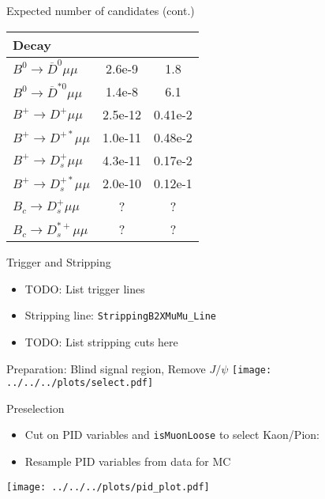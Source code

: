 \documentclass[compress,aspectratio=43]{beamer}
\begin{document}
\begin{frame}{Expected number of candidates (cont.)}
  \centering
  \begin{tabular}{l S S}
    \toprule
    Decay & {} \cite{evans1}\cite{evans2} & {} \\
    \midrule
    $B^0\to \overline{D}^0\mu\mu$ & 2.6e-9 & 1.8 \\
    $B^0\to \overline{D}^{*0}\mu\mu$ & 1.4e-8 & 6.1 \\
    $B^+\to D^+\mu\mu$ & 2.5e-12 & 0.41e-2 \\
    $B^+\to D^{+*}\mu\mu$ & 1.0e-11 & 0.48e-2 \\
    $B^+\to D_s^+\mu\mu$ & 4.3e-11 & 0.17e-2 \\
    $B^+\to D_s^{+*}\mu\mu$ & 2.0e-10 & 0.12e-1 \\
    $B_c\to D_s^+\mu\mu$ & ? & ? \\
    $B_c\to D_s^{*+}\mu\mu$ & ? & ? \\
    \bottomrule
  \end{tabular}
\end{frame}

\begin{frame}{Trigger and Stripping}
  \begin{itemize}
    \item TODO: List trigger lines
  \end{itemize}
  \begin{itemize}
    \item Stripping line: \texttt{StrippingB2XMuMu\_Line}
    \item TODO: List stripping cuts here
  \end{itemize}
\end{frame}

\begin{frame}{Preparation: Blind signal region, Remove $J/\psi$}
  \centering
  \texttt{[image: ../../../plots/select.pdf]}
\end{frame}

\begin{frame}{Preselection}
  \begin{itemize}
    \item {\small Cut on PID variables and \texttt{isMuonLoose} to select Kaon/Pion:}
    \item {\small Resample PID variables from data for MC}
  \end{itemize}
  \centering
  \texttt{[image: ../../../plots/pid\_plot.pdf]}
\end{frame}
\end{document}
